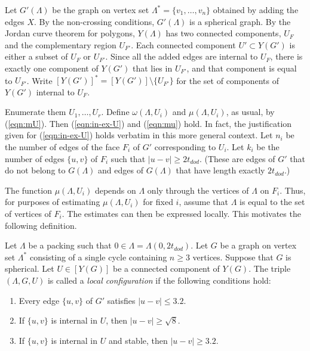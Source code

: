 Let $G'(\Lambda)$ be the graph on vertex set $\Lambda^*=\{v_1,\ldots,v_n\}$ obtained by adding the edges $X$.  By the non-crossing
conditions, $G'(\Lambda)$ is a spherical graph.  
By the Jordan curve theorem for polygons, $Y(\Lambda)$ has two connected 
components,
$U_F$ and the complementary region $U_{F'}$.
Each
connected component $U'\subset Y(G')$ is either a subset of $U_F$ or $U_{F'}$.
Since all the added edges are internal to $U_F$, there is exactly
one component of $Y(G')$ that lies in $U_{F'}$, and that component
is equal to $U_{F'}$.  Write $[Y(G')]^* = [Y(G')]\setminus\{U_{F'}\}$
for the set of components of $Y(G')$ internal to $U_F$.

Enumerate them $U_1,\ldots,U_r$.  Define $\omega(\Lambda,U_i)$ and
$\mu(\Lambda,U_i)$, as usual,  by (\ref{eqn:mU}).  Then
(\ref{eqn:in-ex-U}) and (\ref{eqn:mu}) hold.  In fact, the justification
given for (\ref{eqn:in-ex-U}) holds verbatim in this more general
context. Let $n_i$ be the number of edges of the face
$F_i$ of $G'$ corresponding to $U_i$.  Let $k_i$ be the number of edges
$\{u,v\}$
of $F_i$ such that $|u-v|\ge 2t_{dod}$. (These are edges of $G'$ that do not
belong to $G(\Lambda)$ and edges of $G(\Lambda)$ that have
length exactly $2t_{dod}$.)  

The function $\mu(\Lambda,U_i)$ depends on $\Lambda$ only through
the vertices of $\Lambda$ on $F_i$.  Thus, for purposes of estimating
$\mu(\Lambda,U_i)$ for fixed $i$,  assume that $\Lambda$
is equal to the set of vertices of $F_i$.  The estimates can then
be expressed locally.
   This motivates the following definition.

\begin{definition}
Let $\Lambda$ be a packing such that $0\in\Lambda=\Lambda(0,2t_{dod})$.  
Let $G$ be a graph on vertex set $\Lambda^*$ 
consisting
of a single cycle containing $n\ge 3$ vertices.  
Suppose that $G$ is spherical. 
Let $U\in [Y(G)]$ be a connected component of $Y(G)$.  
The triple $(\Lambda,G,U)$ is called a {\it local configuration} if the
following conditions hold:
\begin{enumerate}
\item Every edge $\{u,v\}$ of $G'$ satisfies $|u-v|\le 3.2$.
\item If
$\{u,v\}$ is internal in  $U$, then $|u-v|\ge \sqrt8$.
\item If $\{u,v\}$ is internal in $U$ and stable,
then $|u-v|\ge 3.2$.
\end{enumerate}
\end{definition}


